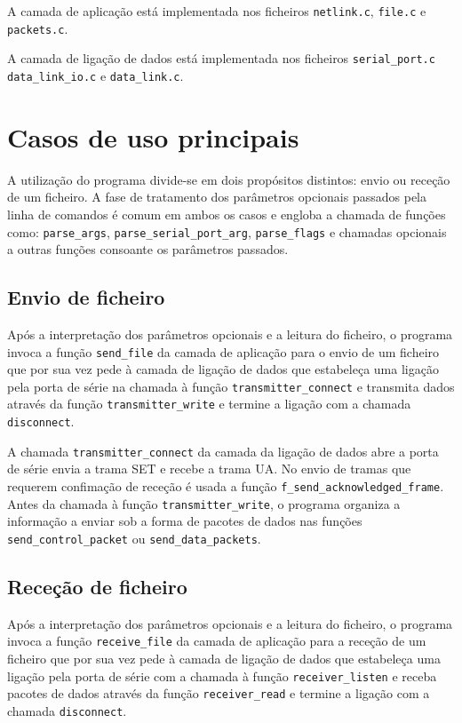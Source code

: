 \documentclass[a4paper,11pt,titlepage]{article}
\begin{document}
A camada de aplicação está implementada nos ficheiros \texttt{netlink.c}, \texttt{file.c} e \texttt{packets.c}.

A camada de ligação de dados está implementada nos ficheiros \texttt{serial\_port.c} \texttt{data\_link\_io.c} e \texttt{data\_link.c}.

\section{Casos de uso principais}

A utilização do programa divide-se em dois propósitos distintos: envio ou receção de um ficheiro. A fase de tratamento dos parâmetros opcionais passados pela linha de comandos é comum em ambos os casos e engloba a chamada de funções como: \texttt{parse\_args}, \texttt{parse\_serial\_port\_arg}, \texttt{parse\_flags} e chamadas opcionais a outras funções consoante os parâmetros passados. 

\subsection*{Envio de ficheiro}
Após a interpretação dos parâmetros opcionais e a leitura do ficheiro, o programa invoca a função \texttt{send\_file} da camada de aplicação para o envio de um ficheiro que por sua vez pede à camada de ligação de dados que estabeleça uma ligação pela porta de série na chamada à função \texttt{transmitter\_connect} e transmita dados através da função \texttt{transmitter\_write} e termine a ligação com a chamada \texttt{disconnect}.

A chamada \texttt{transmitter\_connect} da camada da ligação de dados abre a porta de série envia a trama SET e recebe a trama UA. No envio de tramas que requerem confimação de receção é usada a função \texttt{f\_send\_acknowledged\_frame}. Antes da chamada à função \texttt{transmitter\_write}, o programa organiza a informação a enviar sob a forma de pacotes de dados nas funções \texttt{send\_control\_packet} ou \texttt{send\_data\_packets}.

\subsection*{Receção de ficheiro}
Após a interpretação dos parâmetros opcionais e a leitura do ficheiro, o programa invoca a função \texttt{receive\_file} da camada de aplicação para a receção de um ficheiro que por sua vez pede à camada de ligação de dados que estabeleça uma ligação pela porta de série com a chamada à função \texttt{receiver\_listen} e receba pacotes de dados através da função \texttt{receiver\_read} e termine a ligação com a chamada \texttt{disconnect}.
\end{document}
